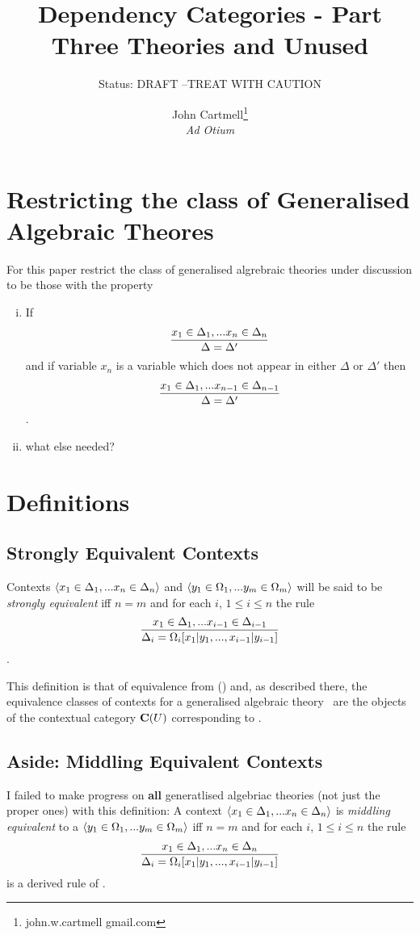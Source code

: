 \documentclass[10pt,a4paper]{scrartcl}
\title{Dependency Categories - Part Three Theories and Unused}
\author{John Cartmell\footnote{john.w.cartmell gmail.com}\\ \normalsize{\textit{Ad Otium}}}
\subtitle{Status: \normalsize{DRAFT --TREAT WITH CAUTION}}
\begin{document}
\maketitle

\section{Restricting the class of Generalised Algebraic Theores}
For this paper restrict the class of generalised algrebraic theories under 
discussion to be those with the property 
\begin{enumerate}[(i)]
\item 
If
$$
\frac{x_1 \in \Delta_1,... x_{n} \in \Delta_{n}}{\Delta=\Delta'}
$$
\intheory and if variable $x_n$ is a variable which does not appear in either
$\Delta$ or $\Delta'$ then
$$
\frac{x_1 \in \Delta_1,... x_{n-1} \in \Delta_{n-1}}{\Delta=\Delta'}
$$
\intheory.
\item
what else needed? 
\end{enumerate}
\section{Definitions}
\subsection{Strongly Equivalent Contexts}
\begin{definition}
Contexts $\langle x_1 \in \Delta_1,... x_{n} \in \Delta_{n}\rangle$ 
and $\langle y_1 \in \Omega_1,... y_{m} \in \Omega_{m}\rangle$ will be said to be \textit{strongly equivalent} iff $n=m$ and for each $i$, $1 \leq i \leq n$ the rule 
$$
\frac{x_1 \in \Delta_1,... x_{i-1} \in \Delta_{i-1}}{\Delta_i=\Omega_i[x_1|y_1,...,x_{i-1}|y_{i-1}]}
$$
\intheory.
\end{definition}

This definition is that of equivalence from (\cite{Cartmell78})  and, as described there, the  equivalence classes of contexts for a generalised algebraic theory \gat\  are the objects of the contextual category $\mathbf{C}(U)$ corresponding to \gat.

\subsection{Aside: Middling Equivalent Contexts}
I failed to make progress on \textbf{all} generatlised algebriac theories
(not just the proper ones) with this definition:
A context $\langle x_1 \in \Delta_1,... x_{n} \in \Delta_{n}\rangle$ 
is  \textit{middling equivalent}  to a $\langle y_1 \in \Omega_1,... y_{m} \in \Omega_{m}\rangle$ iff $n=m$ and for each $i$, $1 \leq i \leq n$ the rule 
$$
\frac{x_1 \in \Delta_1,... x_{n} \in \Delta_{n}}{\Delta_i=\Omega_i[x_1|y_1,...,x_{i-1}|y_{i-1}]}
$$
is a derived rule of \gat. \\
\end{document}
